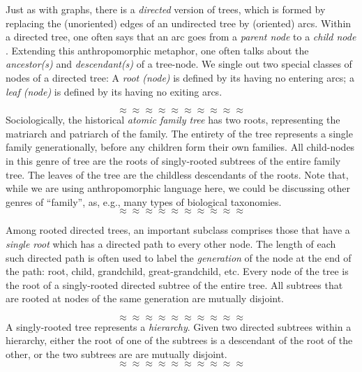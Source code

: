 Just as with graphs, there is a {\em directed} version of trees, which
is formed by replacing the (unoriented) edges of an undirected tree by
(oriented) arcs.  Within a directed tree, one often says that an arc
goes from a {\it parent node}  to a {\it
  child node} .  Extending this
anthropomorphic metaphor, one often talks about the {\it ancestor(s)}
 and {\it descendant(s)}
 of a tree-node.  We single out two
special classes of nodes of a directed tree: A {\it root (node)}
  is defined
by its having no entering arcs; a {\it leaf (node)}   is defined by its having
no exiting arcs.

\[ \approx \approx \approx \approx \approx \approx \approx \approx \approx \approx \]
Sociologically, the historical {\it atomic family tree}  has two roots, representing the matriarch and patriarch of the
family.  The entirety of the tree represents a single family
generationally, before any children form their own families.  All
child-nodes in this genre of tree are the roots of singly-rooted
subtrees of the entire family tree.  The leaves of the tree are the
childless descendants of the roots.  Note that, while we are using
anthropomorphic language here, we could be discussing other genres of
``family'', as, e.g., many types of biological taxonomies.
\[ \approx \approx \approx \approx \approx \approx \approx \approx \approx \approx \]

Among rooted directed trees, an important subclass comprises those
that have a {\em single root} which has a directed path to every other
node.  The length of each such directed path is often used to label
the {\it generation}
of the node at the end of the path: root, child, grandchild,
great-grandchild, etc.
Every node of the tree is the root of a singly-rooted directed
subtree of the entire tree.  All subtrees that are rooted at nodes of
the same generation are mutually disjoint.

\[ \approx \approx \approx \approx \approx \approx \approx \approx \approx \approx \]
A singly-rooted tree represents a {\it hierarchy}.
  Given two
directed subtrees within a hierarchy, either the root of one of the
subtrees is a descendant of the root of the other, or the two subtrees
are are mutually disjoint.
\[ \approx \approx \approx \approx \approx \approx \approx \approx \approx \approx \]

